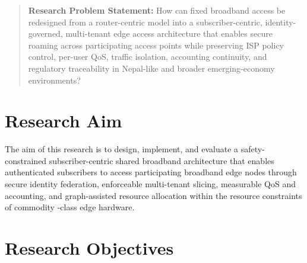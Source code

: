 \begin{quote}
\textbf{Research Problem Statement:} How can fixed broadband access be redesigned from a router-centric model into a subscriber-centric, identity-governed, multi-tenant edge access architecture that enables secure roaming across participating access points while preserving ISP policy control, per-user QoS, traffic isolation, accounting continuity, and regulatory traceability in Nepal-like and broader emerging-economy environments?
\end{quote}

\section{Research Aim}
\label{sec:aim}

The aim of this research is to design, implement, and evaluate a safety-constrained subscriber-centric shared broadband architecture that enables authenticated subscribers to access participating broadband edge nodes through secure identity federation, enforceable multi-tenant slicing, measurable QoS and accounting, and graph-assisted resource allocation within the resource constraints of commodity \openWrt-class edge hardware.

\section{Research Objectives}
\label{sec:objectives}

